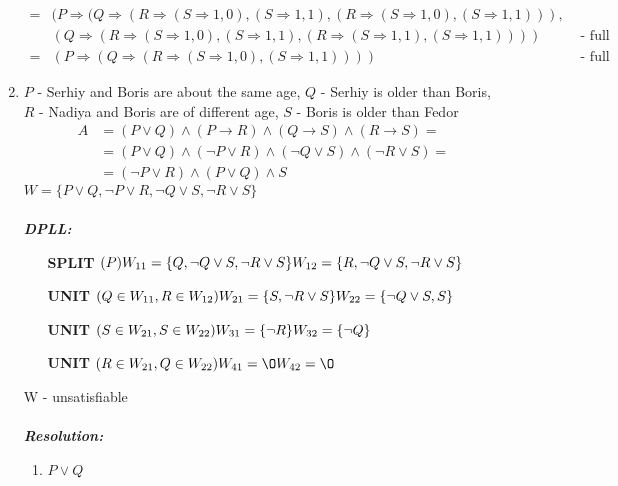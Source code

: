 \documentclass[a4paper,12pt, centered]{article}
\begin{document}
\begin{enumerate}
\begin{align*}
		=&(P\Rightarrow(Q\Rightarrow(R\Rightarrow(S\Rightarrow 1,0),(S\Rightarrow 1,1),(R\Rightarrow(S\Rightarrow 1,0),(S\Rightarrow 1,1))),\\&(Q\Rightarrow(R\Rightarrow(S\Rightarrow 1,0),(S\Rightarrow 1,1),(R\Rightarrow(S\Rightarrow 1,1),(S\Rightarrow 1,1))))&\textrm{ - full unordered}\\
		=&(P\Rightarrow(Q\Rightarrow(R\Rightarrow(S\Rightarrow1,0),(S\Rightarrow1,1))))&\textrm{ - full ordered}
	\end{align*}
	\item 
	$P$ - Serhiy and Boris are about the same age, $Q$ - Serhiy is older than Boris, $R$ - Nadiya and Boris are of different age, $S$ - Boris is older than Fedor
	\begin{align*}
		A&=(P\lor Q)\land(P\to R)\land(Q\to S)\land (R\to S)=\\&=(P\lor Q)\land(\neg P\lor R)\land(\neg Q\lor S)\land (\neg R\lor S)=\\&=(\neg P\lor R)\land(P\lor Q)\land S
	\end{align*}
	$W=\{P\lor Q,\neg P\lor R,\neg Q\lor S,\neg R\lor S\}$
	\\\\\emph{\textbf{DPLL:}}\\
	\begin{itemize}
		\item [\textbf{SPLIT}] $(P)\\W_{11}=\{Q,\neg Q\lor S,\neg R\lor S\}\\W_{12}=\{R,\neg Q\lor S,\neg R\lor S\}$
		\item [\textbf{UNIT}] $(Q\in W_{11},R\in W_{12})\\W_{21}=\{S,\neg R\lor S\}\\W_{22}=\{\neg Q\lor S,S\}$
		\item [\textbf{UNIT}] $(S\in W_{21},S\in W_{22})\\W_{31}=\{\neg R\}\\W_{32}=\{\neg Q\}$
		\item [\textbf{UNIT}] $(R\in W_{21},Q\in W_{22})\\W_{41}=\O\\W_{42}=\O$
	\end{itemize}
	W - unsatisfiable
	\\\\\emph{\textbf{Resolution:}}\\
	\begin{multicols}{4}
		\begin{enumerate}[(1)]
			\item $P\lor Q$

\end{enumerate}
\end{multicols}
\end{enumerate}
\end{document}
